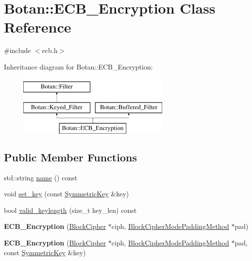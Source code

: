 \hypertarget{classBotan_1_1ECB__Encryption}{\section{Botan\-:\-:E\-C\-B\-\_\-\-Encryption Class Reference}
\label{classBotan_1_1ECB__Encryption}
}


{\ttfamily \#include $<$ecb.\-h$>$}

Inheritance diagram for Botan\-:\-:E\-C\-B\-\_\-\-Encryption\-:\begin{figure}[H]
\begin{center}
\leavevmode
\includegraphics[height=3.000000cm]{classBotan_1_1ECB__Encryption}
\end{center}
\end{figure}
\subsection*{Public Member Functions}
\begin{DoxyCompactItemize}
\item 
std\-::string \hyperlink{classBotan_1_1ECB__Encryption_a3139ce532abc80fdcc21c95b1fce5088}{name} () const 
\item 
void \hyperlink{classBotan_1_1ECB__Encryption_a3d01337ecab00b45a35b74a2966b3d6f}{set\-\_\-key} (const \hyperlink{namespaceBotan_a00c78597211d5c63b63e2a57ddb96d38}{Symmetric\-Key} \&key)
\item 
bool \hyperlink{classBotan_1_1ECB__Encryption_adc074a88817943bc92696877dce342ae}{valid\-\_\-keylength} (size\-\_\-t key\-\_\-len) const 
\item 
\hypertarget{classBotan_1_1ECB__Encryption_ad818946d284d319156ddf71a4afd38a4}{{\bfseries E\-C\-B\-\_\-\-Encryption} (\hyperlink{classBotan_1_1BlockCipher}{Block\-Cipher} $\ast$ciph, \hyperlink{classBotan_1_1BlockCipherModePaddingMethod}{Block\-Cipher\-Mode\-Padding\-Method} $\ast$pad)}\label{classBotan_1_1ECB__Encryption_ad818946d284d319156ddf71a4afd38a4}

\item 
\hypertarget{classBotan_1_1ECB__Encryption_a52235f3f606233d577f808c859b697e6}{{\bfseries E\-C\-B\-\_\-\-Encryption} (\hyperlink{classBotan_1_1BlockCipher}{Block\-Cipher} $\ast$ciph, \hyperlink{classBotan_1_1BlockCipherModePaddingMethod}{Block\-Cipher\-Mode\-Padding\-Method} $\ast$pad, const \hyperlink{namespaceBotan_a00c78597211d5c63b63e2a57ddb96d38}{Symmetric\-Key} \&key)}\label{classBotan_1_1ECB__Encryption_a52235f3f606233d577f808c859b697e6}

\end{DoxyCompactItemize}
